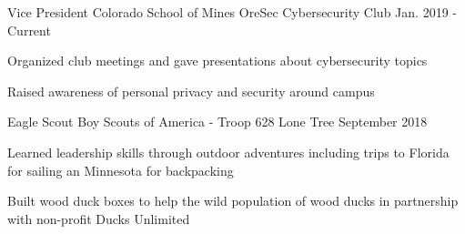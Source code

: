 

\begin{cventries}

  \cventry
    {Vice President} %
    {Colorado School of Mines OreSec Cybersecurity Club} %
    {} %
    {Jan. 2019 - Current} %
    {
      \begin{cvitems} %
        \item {Organized club meetings and gave presentations about
            cybersecurity topics}
        \item {Raised awareness of personal privacy and security around campus}
      \end{cvitems}
    }

  \cventry
    {Eagle Scout} %
    {Boy Scouts of America - Troop 628} %
    {Lone Tree} %
    {September 2018} %
    {
      \begin{cvitems} %
        \item {Learned leadership skills through outdoor adventures
            including trips to Florida for sailing an Minnesota for
            backpacking}
        \item {Built wood duck boxes to help the wild population of
            wood ducks in partnership with non-profit Ducks Unlimited}
      \end{cvitems}
    }

\end{cventries}

